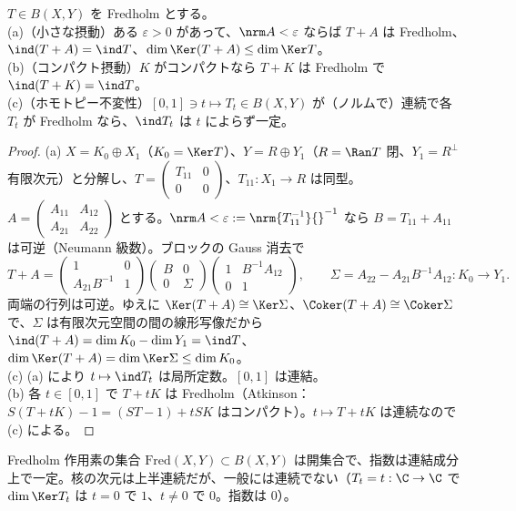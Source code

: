 \begin{thm}[指数の安定性]\label{thm:stab}\tP
$T\in B(X,Y)$ を Fredholm とする。\\
(a)（小さな摂動）ある $\varepsilon>0$ があって、$\nrm A{}<\varepsilon$ ならば $T+A$ は Fredholm、$\ind(T+A)=\ind T$、$\dim\Ker(T+A)\le\dim\Ker T$。\\
(b)（コンパクト摂動）$K$ がコンパクトなら $T+K$ は Fredholm で $\ind(T+K)=\ind T$。\\
(c)（ホモトピー不変性）$[0,1]\ni t\mapsto T_t\in B(X,Y)$ が（ノルムで）連続で各 $T_t$ が Fredholm なら、$\ind T_t$ は $t$ によらず一定。
\end{thm}
\begin{proof}
(a) $X=K_0\oplus X_1$（$K_0=\Ker T$）、$Y=R\oplus Y_1$（$R=\Ran T$ 閉、$Y_1=R^\perp$ 有限次元）と分解し、$T=\begin{pmatrix}T_{11}&0\\0&0\end{pmatrix}$、$T_{11}:X_1\to R$ は同型。$A=\begin{pmatrix}A_{11}&A_{12}\\A_{21}&A_{22}\end{pmatrix}$ とする。$\nrm A{}<\varepsilon:=\nrm{T_{11}^{-1}}{}^{-1}$ なら $B=T_{11}+A_{11}$ は可逆（Neumann 級数）。ブロックの Gauss 消去で
\[
T+A=\begin{pmatrix}1&0\\A_{21}B^{-1}&1\end{pmatrix}\begin{pmatrix}B&0\\0&\Sigma\end{pmatrix}\begin{pmatrix}1&B^{-1}A_{12}\\0&1\end{pmatrix},\qquad\Sigma=A_{22}-A_{21}B^{-1}A_{12}:K_0\to Y_1.
\]
両端の行列は可逆。ゆえに $\Ker(T+A)\cong\Ker\Sigma$、$\Coker(T+A)\cong\Coker\Sigma$ で、$\Sigma$ は有限次元空間の間の線形写像だから $\ind(T+A)=\dim K_0-\dim Y_1=\ind T$、$\dim\Ker(T+A)=\dim\Ker\Sigma\le\dim K_0$。\\
(c) (a) により $t\mapsto\ind T_t$ は局所定数。$[0,1]$ は連結。\\
(b) 各 $t\in[0,1]$ で $T+tK$ は Fredholm（Atkinson：$S(T+tK)-1=(ST-1)+tSK$ はコンパクト）。$t\mapsto T+tK$ は連続なので (c) による。
\end{proof}
\begin{cor}\label{cor:fredopen}
Fredholm 作用素の集合 $\mathrm{Fred}(X,Y)\subset B(X,Y)$ は開集合で、指数は連結成分上で一定。核の次元は上半連続だが、一般には連続でない（$T_t=t:\C\to\C$ で $\dim\Ker T_t$ は $t=0$ で $1$、$t\neq0$ で $0$。指数は $0$）。
\end{cor}
